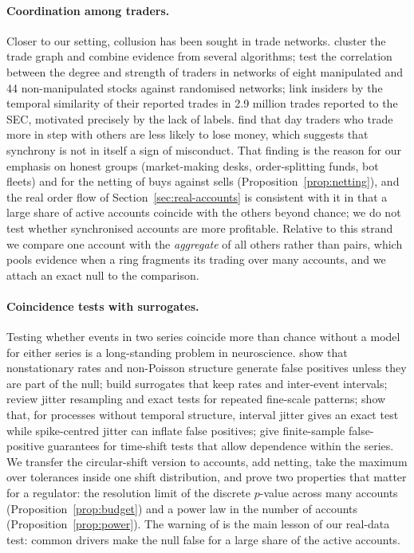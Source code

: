 \paragraph{Coordination among traders.} Closer to our setting, collusion has been sought in trade networks. \citet{palshikar2008} cluster the trade graph and combine evidence from several algorithms; \citet{sun2012} test the correlation between the degree and strength of traders in networks of eight manipulated and 44 non-manipulated stocks against randomised networks; \citet{jaeger2025} link insiders by the temporal similarity of their reported trades in 2.9 million trades reported to the SEC, motivated precisely by the lack of labels. \citet{saavedra2011} find that day traders who trade more in step with others are less likely to lose money, which suggests that synchrony is not in itself a sign of misconduct. That finding is the reason for our emphasis on honest groups (market-making desks, order-splitting funds, bot fleets) and for the netting of buys against sells (Proposition~\ref{prop:netting}), and the real order flow of Section~\ref{sec:real-accounts} is consistent with it in that a large share of active accounts coincide with the others beyond chance; we do not test whether synchronised accounts are more profitable. Relative to this strand we compare one account with the \emph{aggregate} of all others rather than pairs, which pools evidence when a ring fragments its trading over many accounts, and we attach an exact null to the comparison.

\paragraph{Coincidence tests with surrogates.} Testing whether events in two series coincide more than chance without a model for either series is a long-standing problem in neuroscience. \citet{grun2009} show that nonstationary rates and non-Poisson structure generate false positives unless they are part of the null; \citet{louis2010} build surrogates that keep rates and inter-event intervals; \citet{amarasingham2012} review jitter resampling and exact tests for repeated fine-scale patterns; \citet{platkiewicz2017} show that, for processes without temporal structure, interval jitter gives an exact test while spike-centred jitter can inflate false positives; \citet{liang2025} give finite-sample false-positive guarantees for time-shift tests that allow dependence within the series. We transfer the circular-shift version to accounts, add netting, take the maximum over tolerances inside one shift distribution, and prove two properties that matter for a regulator: the resolution limit of the discrete $p$-value across many accounts (Proposition~\ref{prop:budget}) and a power law in the number of accounts (Proposition~\ref{prop:power}). The warning of \citet{grun2009} is the main lesson of our real-data test: common drivers make the null false for a large share of the active accounts.

